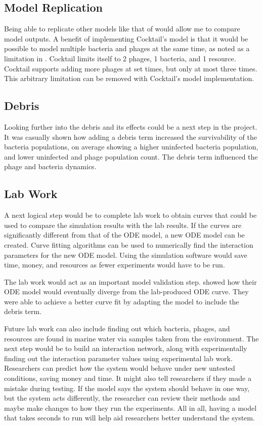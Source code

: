 \subsection{Model Replication}
Being able to replicate other models like that of \citet{nilssonCocktailComputerProgram2022} would allow me to compare model outputs. 
A benefit of implementing Cocktail's model is that it would be possible to model multiple bacteria and phages at the same time, as noted as a limitation in . 
Cocktail limits itself to 2 phages, 1 bacteria, and 1 resource. 
Cocktail supports adding more phages at set times, but only at most three times. 
This arbitrary limitation can be removed with Cocktail's model implementation. 

\subsection{Debris}
Looking further into the debris and its effects could be a next step in the project. 
It was casually shown how adding a debris term increased the survivability of the bacteria populations, on average showing a higher uninfected bacteria population, and lower uninfected and phage population count. 
The debris term influenced the phage and bacteria dynamics. 

\subsection{Lab Work}
A next logical step would be to complete lab work to obtain curves that could be used to compare the simulation results with the lab results. 
If the curves are significantly different from that of the ODE model, a new ODE model can be created. 
Curve fitting algorithms can be used to numerically find the interaction parameters for the new ODE model. 
Using the simulation software would save time, money, and resources as fewer experiments would have to be run. 

The lab work would act as an important model validation step. 
\citet{deyEmergentHigherorderInteractions2025} showed how their ODE model would eventually diverge from the lab-produced ODE curve. 
They were able to achieve a better curve fit by adapting the model to include the debris term. 

Future lab work can also include finding out which bacteria, phages, and resources are found in marine water via samples taken from the environment. 
The next step would be to build an interaction network, along with experimentally finding out the interaction parameter values using experimental lab work. 
Researchers can predict how the system would behave under new untested conditions, saving money and time. 
It might also tell researchers if they made a mistake during testing. 
If the model says the system should behave in one way, but the system acts differently, the researcher can review their methods and maybe make changes to how they run the experiments. 
All in all, having a model that takes seconds to run will help aid researchers better understand the system. 

